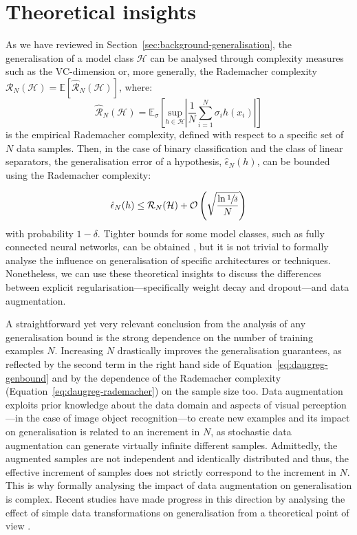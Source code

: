 {\section{Theoretical insights}
\label{sec:daugreg-theoretical_insights}
As we have reviewed in Section~\ref{sec:background-generalisation}, the generalisation of a model class $\mathcal{H}$ can be analysed through complexity measures such as the VC-dimension or, more generally, the Rademacher complexity $\mathcal{R}_{N}(\mathcal{H}) = \mathbb{E} \left[ \hat{\mathcal{R}}_{N}(\mathcal{H}) \right]$, where:
%
\begin{equation}
\label{eq:daugreg-rademacher}
  \hat{\mathcal{R}}_{N}(\mathcal{H}) = \mathbb{E}_{\sigma} \left[ \underset{h \in \mathcal{H}}{\mathrm{sup}} \left| \frac{1}{N} \sum_{i=1}^{N} \sigma_{i}h(x_{i}) \right| \right]
\end{equation}
% 
is the empirical Rademacher complexity, defined with respect to a specific set of $N$ data samples. Then, in the case of binary classification and the class of linear separators, the generalisation error of a hypothesis, $\hat{\epsilon}_{N}(h)$, can be bounded using the Rademacher complexity:

\begin{equation}
\label{eq:daugreg-genbound}
 \hat{\epsilon}_{N}(h) \leq \mathcal{R}_{N}(\mathcal{H}) + \mathcal{O} \left( \sqrt{\frac{\ln \sfrac{1}{\delta}}{N}} \right)
\end{equation}
%
with probability $1 - \delta$. Tighter bounds for some model classes, such as fully connected neural networks, can be obtained \citep{bartlett2002rademacher}, but it is not trivial to formally analyse the influence on generalisation of specific architectures or techniques. Nonetheless, we can use these theoretical insights to discuss the differences between explicit regularisation---specifically weight decay and dropout---and data augmentation. 

A straightforward yet very relevant conclusion from the analysis of any generalisation bound is the strong dependence on the number of training examples $N$. Increasing $N$ drastically improves the generalisation guarantees, as reflected by the second term in the right hand side of Equation~\ref{eq:daugreg-genbound} and by the dependence of the Rademacher complexity (Equation~\ref{eq:daugreg-rademacher}) on the sample size too. Data augmentation exploits prior knowledge about the data domain and aspects of visual perception---in the case of image object recognition---to create new examples and its impact on generalisation is related to an increment in $N$, as stochastic data augmentation can generate virtually infinite different samples. Admittedly, the augmented samples are not independent and identically distributed and thus, the effective increment of samples does not strictly correspond to the increment in $N$. This is why formally analysing the impact of data augmentation on generalisation is complex. Recent studies have made progress in this direction by analysing the effect of simple data transformations on generalisation from a theoretical point of view \citep{chen2019invariance, rajput2019daug}.

}
